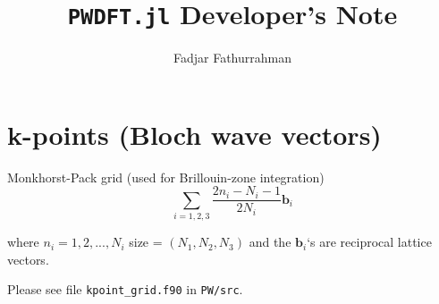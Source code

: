 \documentclass[a4paper,12pt]{article}
\begin{document}
\title{\texttt{PWDFT.jl} Developer's Note}
\author{Fadjar Fathurrahman}
\maketitle



\section{k-points (Bloch wave vectors)}

Monkhorst-Pack grid (used for Brillouin-zone integration)
\begin{equation}
\sum_{i=1,2,3} \frac{2n_i -N_i - 1}{2N_i} \mathbf{b}_i
\end{equation}

where $n_i=1,2,...,N_{i}$
size = \((N_1, N_2, N_3)\) and the \(\mathbf{b}_i\)‘s are reciprocal lattice vectors.

Please see file \texttt{kpoint\_grid.f90} in \verb|PW/src|.
\end{document}
